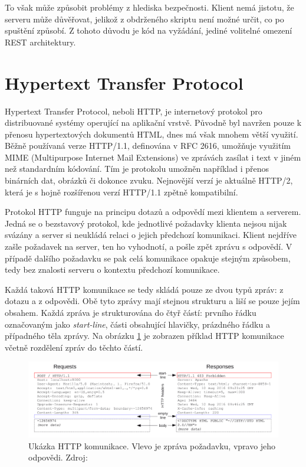 To však může způsobit problémy z hlediska bezpečnosti. Klient nemá jistotu, že serveru může důvěřovat, jelikož z obdrženého skriptu není možné určit, co po spuštění způsobí. Z tohoto důvodu je kód na vyžádání, jediné volitelné omezení REST architektury.



\section{Hypertext Transfer Protocol}
\label{chap_HTTP}

Hypertext Transfer Protocol, neboli HTTP, je internetový protokol pro distribuované systémy operující na aplikační vrstvě. Původně byl navržen pouze k přenosu hypertextových dokumentů HTML, dnes má však mnohem větší využití. Běžně používaná verze HTTP/1.1, definována v RFC 2616, umožňuje využitím MIME (Multipurpose Internet Mail Extensions) ve zprávách zasílat i text v jiném než standardním kódování. Tím je protokolu umožněn například i přenos binárních dat, obrázků či dokonce zvuku. Nejnovější verzí je aktuálně HTTP/2, která je s hojně rozšířenou verzí HTTP/1.1 zpětně kompatibilní.\cite{rfc2616}


Protokol HTTP funguje na principu dotazů a odpovědí mezi klientem a serverem. Jedná se o bezstavový protokol, kde jednotlivé požadavky klienta nejsou nijak svázány a server si neukládá relaci o jejich předchozí komunikaci. Klient nejdříve zašle požadavek na server, ten ho vyhodnotí, a pošle zpět zprávu s odpovědí. V případě dalšího požadavku se pak celá komunikace opakuje stejným způsobem, tedy bez znalosti serveru o kontextu předchozí komunikace.

Každá taková HTTP komunikace se tedy skládá pouze ze dvou typů zpráv: z dotazu a z odpovědi. Obě tyto zprávy mají stejnou strukturu a liší se pouze jejím obsahem. Každá zpráva je strukturována do čtyř částí: prvního řádku označovaným jako \textit{start-line}, části obsahující hlavičky, prázdného řádku a případného těla zprávy. Na obrázku \ref{fig_UkazkaKomunikace} je zobrazen příklad HTTP komunikace včetně rozdělení zpráv do těchto částí.

\begin{figure}[hbt]
	\centering
	\includegraphics[width=1\textwidth]{obrazky-figures/RequestsResponse.png}
	\caption{Ukázka HTTP komunikace. Vlevo je zpráva požadavku, vpravo jeho odpovědi. Zdroj: \cite{mozilla}}
	\label{fig_UkazkaKomunikace}
\end{figure}

